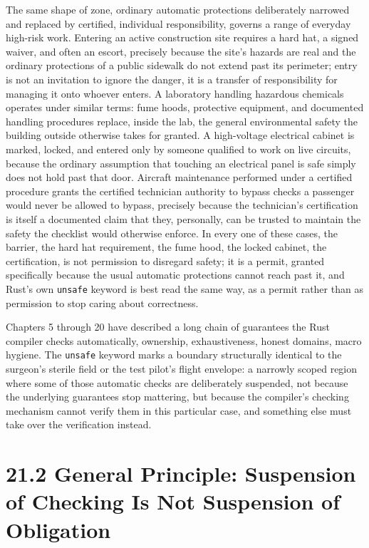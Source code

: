\documentclass[11pt]{book}
\begin{document}
The same shape of zone, ordinary automatic protections deliberately narrowed and replaced by certified, individual responsibility, governs a range of everyday high-risk work. Entering an active construction site requires a hard hat, a signed waiver, and often an escort, precisely because the site's hazards are real and the ordinary protections of a public sidewalk do not extend past its perimeter; entry is not an invitation to ignore the danger, it is a transfer of responsibility for managing it onto whoever enters. A laboratory handling hazardous chemicals operates under similar terms: fume hoods, protective equipment, and documented handling procedures replace, inside the lab, the general environmental safety the building outside otherwise takes for granted. A high-voltage electrical cabinet is marked, locked, and entered only by someone qualified to work on live circuits, because the ordinary assumption that touching an electrical panel is safe simply does not hold past that door. Aircraft maintenance performed under a certified procedure grants the certified technician authority to bypass checks a passenger would never be allowed to bypass, precisely because the technician's certification is itself a documented claim that they, personally, can be trusted to maintain the safety the checklist would otherwise enforce. In every one of these cases, the barrier, the hard hat requirement, the fume hood, the locked cabinet, the certification, is not permission to disregard safety; it is a permit, granted specifically because the usual automatic protections cannot reach past it, and Rust's own \texttt{unsafe} keyword is best read the same way, as a permit rather than as permission to stop caring about correctness.

Chapters 5 through 20 have described a long chain of guarantees the Rust compiler checks automatically, ownership, exhaustiveness, honest domains, macro hygiene. The \texttt{unsafe} keyword marks a boundary structurally identical to the surgeon's sterile field or the test pilot's flight envelope: a narrowly scoped region where some of those automatic checks are deliberately suspended, not because the underlying guarantees stop mattering, but because the compiler's checking mechanism cannot verify them in this particular case, and something else must take over the verification instead.

\section*{21.2 General Principle: Suspension of Checking Is Not Suspension of Obligation}
\end{document}
